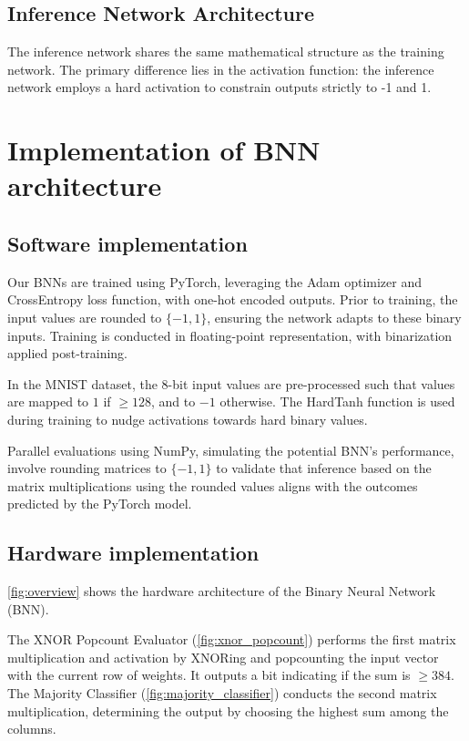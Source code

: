 \documentclass[conference]{IEEEtran}
\newcounter{todocount}
\newcommand{\todo}[1]{
  \stepcounter{todocount}
}
\begin{document}
\subsection{Inference Network Architecture}
The inference network shares the same mathematical structure as the training network. The primary difference lies in the activation function: the inference network employs a hard activation to constrain outputs strictly to -1 and 1.



\section{Implementation of BNN architecture}
\subsection{Software implementation}
\todo{list learning rate, batch size}

Our BNNs are trained using PyTorch, leveraging the Adam optimizer and CrossEntropy loss function, with one-hot encoded outputs. Prior to training, the input values are rounded to \(\{-1, 1\}\), ensuring the network adapts to these binary inputs. Training is conducted in floating-point representation, with binarization applied post-training.

In the MNIST dataset, the 8-bit input values are pre-processed such that values are mapped to $1$ if $\geq 128$, and to $-1$ otherwise. The HardTanh function is used during training to nudge activations towards hard binary values. 

Parallel evaluations using NumPy, simulating the potential BNN's performance, involve rounding matrices to \(\{-1, 1\}\) to validate that inference based on the matrix multiplications using the rounded values aligns with the outcomes predicted by the PyTorch model.


\subsection{Hardware implementation}

\autoref{fig:overview} shows the hardware architecture of the Binary Neural Network (BNN). 

The XNOR Popcount Evaluator (\autoref{fig:xnor_popcount}) performs the first matrix multiplication and activation by XNORing and popcounting the input vector with the current row of weights. It outputs a bit indicating if the sum is $\geq 384$. The Majority Classifier (\autoref{fig:majority_classifier}) conducts the second matrix multiplication, determining the output by choosing the highest sum among the columns.
\end{document}
